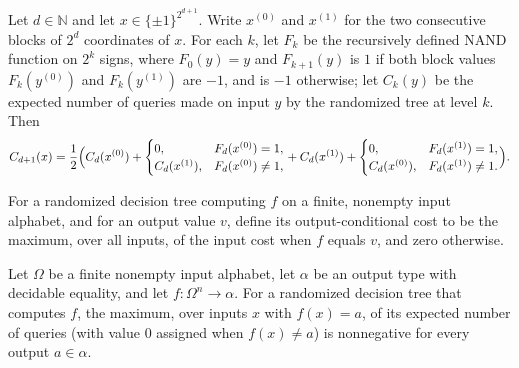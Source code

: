 \begin{theorem}
\label{FABL.recursiveNandRandomizedTree_inputCost_succ}
\leanok
{}
Let $d\in\mathbb{N}$ and let $x\in\{\pm1\}^{2^{d+1}}$. Write $x^{(0)}$ and $x^{(1)}$ for
the two consecutive blocks of $2^d$ coordinates of $x$. For each $k$, let $F_k$ be the
recursively defined NAND function on $2^k$ signs, where $F_0(y)=y$ and $F_{k+1}(y)$ is
$1$ if both block values $F_k(y^{(0)})$ and $F_k(y^{(1)})$ are $-1$, and is $-1$
otherwise; let $C_k(y)$ be the expected number of queries made on input $y$ by the
randomized tree at level $k$. Then
\[
C_{d+1}(x)=\frac12\Bigl(C_d(x^{(0)})+\begin{cases}0,&F_d(x^{(0)})=1,\\
C_d(x^{(1)}),&F_d(x^{(0)})\ne1,\end{cases}+C_d(x^{(1)})+\begin{cases}0,&F_d(x^{(1)})=1,\\
C_d(x^{(0)}),&F_d(x^{(1)})\ne1.\end{cases}\Bigr).
\]
\end{theorem}

\begin{definition}
\label{FABL.RandomizedDecisionTree.outputConditionalCost}
\leanok
{}
For a randomized decision tree computing $f$ on a finite, nonempty input alphabet, and
for an output value $v$, define its output-conditional cost to be the maximum, over all
inputs, of the input cost when $f$ equals $v$, and zero otherwise.
\end{definition}

\begin{theorem}
\label{FABL.RandomizedDecisionTree.outputConditionalCost_nonneg}
\leanok
{}
Let $\Omega$ be a finite nonempty input alphabet, let $\alpha$ be an output type with
decidable equality, and let $f:\Omega^n\to\alpha$. For a randomized decision tree that
computes $f$, the maximum, over inputs $x$ with $f(x)=a$, of its expected number of
queries (with value $0$ assigned when $f(x)\ne a$) is nonnegative for every output
$a\in\alpha$.
\end{theorem}

